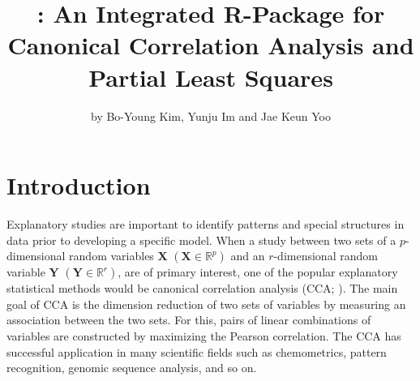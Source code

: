 \title{: An Integrated R-Package for
Canonical Correlation Analysis and Partial Least Squares}

\author{by Bo-Young Kim, Yunju Im and Jae Keun Yoo }

\maketitle
{}

\section{Introduction}
Explanatory studies are important
to identify patterns and special structures in data
prior to developing a specific model.
When a study between two sets of a $p$-dimensional random variables $\mathbf{X}$ $(\mathbf{X}\in\mathbb{R}^{p})$ and
an $r$-dimensional random variable $\mathbf{Y}$ $(\mathbf{Y}\in\mathbb{R}^{r})$,
are of primary interest,
one of the popular explanatory statistical methods would be
canonical correlation analysis (CCA; \cite{cca}).
The main goal of CCA is the dimension reduction of two sets of variables
by measuring an association between the two sets.
For this, pairs of linear combinations of variables
are constructed by maximizing the Pearson correlation.
The CCA has successful application in many scientific fields
such as chemometrics, pattern recognition, genomic sequence analysis, and so on.


